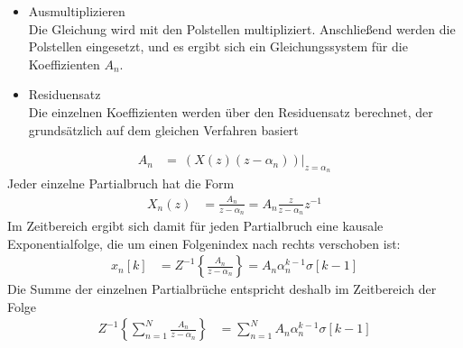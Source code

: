 \begin{itemize}
\item
  Ausmultiplizieren\\
  Die Gleichung wird mit den Polstellen multipliziert. Anschließend werden die Polstellen eingesetzt, und es ergibt sich ein Gleichungssystem für die Koeffizienten \(A_{n}\).
\item
  Residuensatz\\
  Die einzelnen Koeffizienten werden über den Residuensatz berechnet, der grundsätzlich auf dem gleichen Verfahren basiert
\end{itemize}
\begin{align}
A_{n} &= \left. \ \left( X(z)  \left( z - \alpha_{n} \right) \right) \right|_{z = \alpha_{n}} \label{eq:5.92}
\end{align}
Jeder einzelne Partialbruch hat die Form
\begin{align}
X_{n}(z) &= \frac{A_{n}}{z - \alpha_{n}} = A_{n}  \frac{z}{z - \alpha_{n}}  z^{- 1} \label{eq:5.93}
\end{align}
Im Zeitbereich ergibt sich damit für jeden Partialbruch eine kausale Exponentialfolge, die um einen Folgenindex nach rechts verschoben ist:
\begin{align}
x_{n}[ k] &= Z^{- 1}\left\{ \frac{A_{n}}{z - \alpha_{n}} \right\} = A_{n}  \alpha_{n}^{k - 1}  \sigma[ k - 1] \label{eq:5.94}
\end{align}
Die Summe der einzelnen Partialbrüche entspricht deshalb im Zeitbereich der Folge
\begin{align}
Z^{- 1}\left\{ \sum\limits_{n = 1}^{N}\frac{A_{n}}{z - \alpha_{n}} \right\} &= \sum\limits_{n = 1}^{N}{A_{n}  \alpha_{n}^{k - 1}  \sigma[ k - 1]} \label{eq:5.95}
\end{align}
